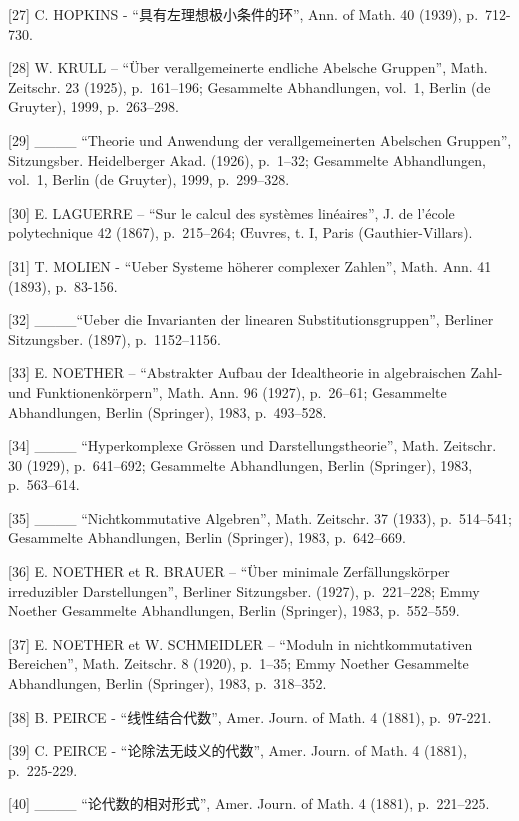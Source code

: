 {[}27{]} C. HOPKINS - ``具有左理想极小条件的环'', Ann. of Math. 40 (1939), p.~712-730.

{[}28{]} W. KRULL -- ``Über verallgemeinerte endliche Abelsche Gruppen'', Math. Zeitschr. 23 (1925), p.~161--196; Gesammelte Abhandlungen, vol.~1, Berlin (de Gruyter), 1999, p.~263--298.

{[}29{]} \_\_\_\_ ``Theorie und Anwendung der verallgemeinerten Abelschen Gruppen'', Sitzungsber. Heidelberger Akad. (1926), p.~1--32; Gesammelte Abhandlungen, vol.~1, Berlin (de Gruyter), 1999, p.~299--328.

{[}30{]} E. LAGUERRE -- ``Sur le calcul des systèmes linéaires'', J. de l'école polytechnique 42 (1867), p.~215--264; Œuvres, t. I, Paris (Gauthier-Villars).

{[}31{]} T. MOLIEN - ``Ueber Systeme höherer complexer Zahlen'', Math. Ann. 41 (1893), p.~83-156.

{[}32{]} \_\_\_\_``Ueber die Invarianten der linearen Substitutionsgruppen'', Berliner Sitzungsber. (1897), p.~1152--1156.

{[}33{]} E. NOETHER -- ``Abstrakter Aufbau der Idealtheorie in algebraischen Zahl- und Funktionenkörpern'', Math. Ann. 96 (1927), p.~26--61; Gesammelte Abhandlungen, Berlin (Springer), 1983, p.~493--528.

{[}34{]} \_\_\_\_ ``Hyperkomplexe Grössen und Darstellungstheorie'', Math. Zeitschr. 30 (1929), p.~641--692; Gesammelte Abhandlungen, Berlin (Springer), 1983, p.~563--614.

{[}35{]} \_\_\_\_ ``Nichtkommutative Algebren'', Math. Zeitschr. 37 (1933), p.~514--541; Gesammelte Abhandlungen, Berlin (Springer), 1983, p.~642--669.

{[}36{]} E. NOETHER et R. BRAUER -- ``Über minimale Zerfällungskörper irreduzibler Darstellungen'', Berliner Sitzungsber. (1927), p.~221--228; Emmy Noether Gesammelte Abhandlungen, Berlin (Springer), 1983, p.~552--559.

{[}37{]} E. NOETHER et W. SCHMEIDLER -- ``Moduln in nichtkommutativen Bereichen'', Math. Zeitschr. 8 (1920), p.~1--35; Emmy Noether Gesammelte Abhandlungen, Berlin (Springer), 1983, p.~318--352.

{[}38{]} B. PEIRCE - ``线性结合代数'', Amer. Journ. of Math. 4 (1881), p.~97-221.

{[}39{]} C. PEIRCE - ``论除法无歧义的代数'', Amer. Journ. of Math. 4 (1881), p.~225-229.

{[}40{]} \_\_\_\_ ``论代数的相对形式'', Amer. Journ. of Math. 4 (1881), p.~221--225.

